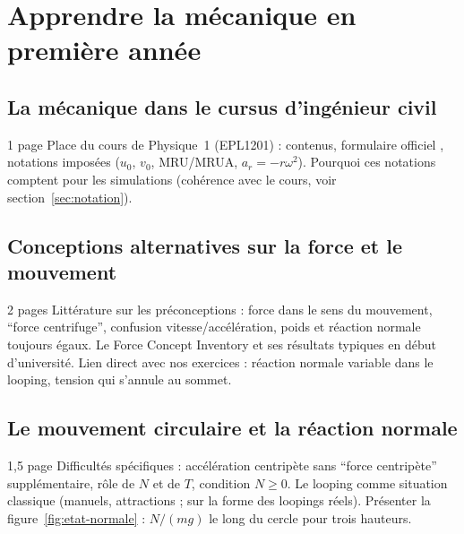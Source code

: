 
\chapter{Apprendre la mécanique en première année}
\label{chap:difficultes}

\section{La mécanique dans le cursus d'ingénieur civil}

\begin{arediger}{1 page}
Place du cours de Physique~1 (EPL1201) : contenus, formulaire officiel
\parencite{formulaire_epl1201}, notations imposées (\(u_0\), \(v_0\), MRU/MRUA,
\(a_r = -r \omega^2\)). Pourquoi ces notations comptent pour les
simulations (cohérence avec le cours, voir section~\ref{sec:notation}).
\end{arediger}

\section{Conceptions alternatives sur la force et le mouvement}

\begin{arediger}{2 pages}
Littérature sur les préconceptions : force dans le sens du mouvement,
\enquote{force centrifuge}, confusion vitesse/accélération, poids et
réaction normale toujours égaux. Le Force Concept Inventory
\parencite{hestenes1992fci} et ses résultats typiques en début d'université.
Lien direct avec nos exercices : réaction normale variable dans le looping,
tension qui s'annule au sommet.
\end{arediger}

\section{Le mouvement circulaire et la réaction normale}

\begin{arediger}{1,5 page}
Difficultés spécifiques : accélération centripète sans \enquote{force
centripète} supplémentaire, rôle de \(N\) et de \(T\), condition \(N \geq 0\).
Le looping comme situation classique (manuels, attractions ;
\textcite{pendrill2005loops} sur la forme des loopings réels). Présenter la
figure~\ref{fig:etat-normale} : \(N/(m g)\) le long du cercle pour trois
hauteurs.
\end{arediger}

